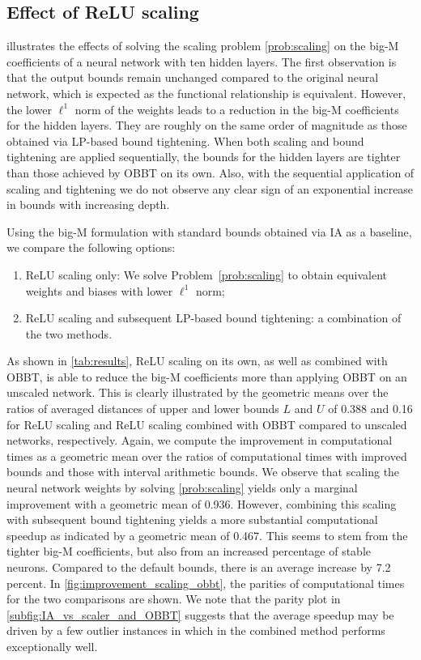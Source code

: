 \subsection{Effect of ReLU scaling}

 illustrates the effects of solving the scaling problem \eqref{prob:scaling} on the big-M coefficients of a neural network with ten hidden layers. The first observation is that the output bounds remain unchanged compared to the original neural network, which is expected as the functional relationship is equivalent. However, the lower $\ell^1$ norm of the weights leads to a reduction in the big-M coefficients for the hidden layers. They are roughly on the same order of magnitude as those obtained via LP-based bound tightening. When both scaling and bound tightening are applied sequentially, the bounds for the hidden layers are tighter than those achieved by OBBT on its own. Also, with the sequential application of scaling and tightening we do not observe any clear sign of an exponential increase in bounds with increasing depth.

Using the big-M formulation with standard bounds obtained via IA as a baseline, we compare the following options:
\begin{enumerate}
    \item ReLU scaling only: We solve Problem~\eqref{prob:scaling} to obtain equivalent weights and biases with lower $\ell^1$ norm;
    \item ReLU scaling and subsequent LP-based bound tightening: a combination of the two methods.
\end{enumerate}
As shown in \vref{tab:results}, ReLU scaling on its own, as well as combined with OBBT, is able to reduce the big-M coefficients more than applying OBBT on an unscaled network. This is clearly illustrated by the geometric means over the ratios of averaged distances of upper and lower bounds $L$ and $U$ of 0.388 and 0.16 for ReLU scaling and ReLU scaling combined with OBBT compared to unscaled networks, respectively. 
Again, we compute the improvement in computational times as a geometric mean over the ratios of computational times with improved bounds and those with interval arithmetic bounds. We observe that scaling the neural network weights by solving \eqref{prob:scaling} yields only a marginal improvement with a geometric mean of {0.936}. However, combining this scaling with subsequent bound tightening yields a more substantial computational speedup as indicated by a geometric mean of {0.467}. This seems to stem from the tighter big-M coefficients, but also from an increased percentage of stable neurons. Compared to the default bounds, there is an average increase by {7.2} percent. In \vref{fig:improvement_scaling_obbt}, the parities of  computational times for the two comparisons are shown. We note that the parity plot in \vref{subfig:IA_vs_scaler_and_OBBT} suggests that the average speedup may be driven by a few outlier instances in which in the combined method performs exceptionally well.

